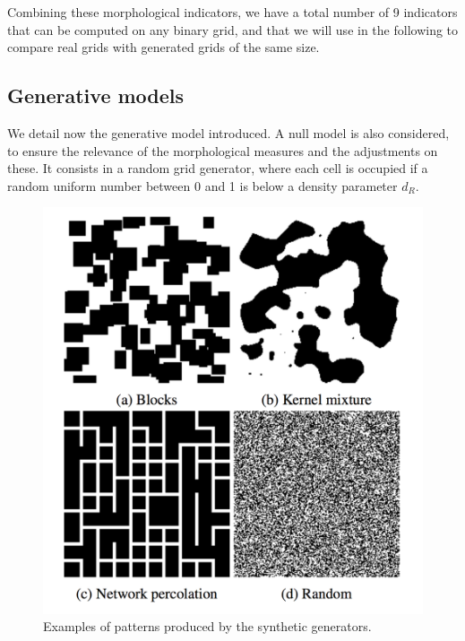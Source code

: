 \documentclass[letterpaper]{article}
\begin{document}
Combining these morphological indicators, we have a total number of 9 indicators that can be computed on any binary grid, and that we will use in the following to compare real grids with generated grids of the same size.








\subsection{Generative models}

We detail now the generative model introduced. A null model is also considered, to ensure the relevance of the morphological measures and the adjustments on these. It consists in a random grid generator, where each cell is occupied if a random uniform number between 0 and 1 is below a density parameter $d_R$.

\begin{figure}
    \centering
    \includegraphics[width=\linewidth]{fig1.png}
    \caption{Examples of patterns produced by the synthetic generators.}
    \label{fig:generators}
\end{figure}
\end{document}
